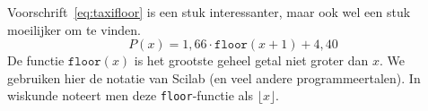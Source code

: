 Voorschrift~\eqref{eq:taxifloor} is een stuk interessanter, maar ook wel een stuk moeilijker om te vinden.
\begin{equation}\label{eq:taxifloor}
P(x)= 1,66\cdot \mathtt{floor}(x+1)+4,40
\end{equation}
De functie $\mathtt{floor}(x)$ is het grootste geheel getal niet groter dan $x$. We gebruiken hier de notatie van Scilab (en veel andere programmeertalen). In wiskunde noteert men deze \verb+floor+-functie als $\lfloor x \rfloor$.



